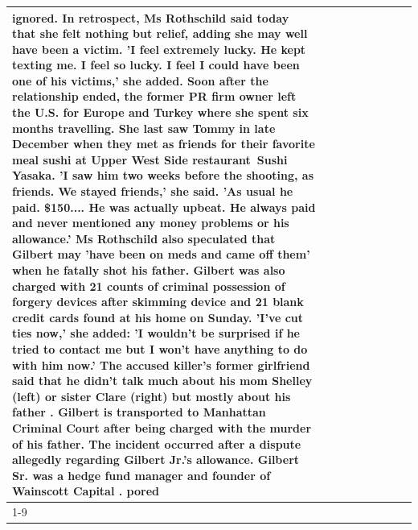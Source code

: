 \begin{table}[H]
\begin{tabular}{lllrlllll}
ignored. In retrospect, Ms Rothschild said today that she felt nothing but relief, adding she may well have been a victim. 'I feel extremely lucky. He kept texting me. I feel so lucky. I feel I could have been one of his victims,' she added. Soon after the relationship ended, the former PR firm owner left the U.S. for Europe and Turkey where she spent six months  travelling. She last saw Tommy in late December when they met as friends for their favorite meal sushi at Upper West Side restaurant Sushi Yasaka. 'I saw him two weeks before the shooting, as friends. We stayed friends,' she said. 'As usual he paid. \$150.... He was actually upbeat. He always paid and never mentioned any money problems or his allowance.' Ms Rothschild also speculated that Gilbert may 'have been on meds and came off them' when he fatally shot his father. Gilbert was also charged with 21 counts of criminal possession of forgery devices after skimming device and 21 blank credit cards found at his home on Sunday. 'I've cut ties now,' she added: 'I wouldn’t be surprised if he tried to contact me but I won’t have anything to do with him now.' The accused killer's former girlfriend said that he didn't talk much about his mom Shelley (left) or sister Clare (right) but mostly about his father . Gilbert is transported to Manhattan Criminal Court  after being charged with the murder of his father. The incident occurred after a dispute allegedly regarding Gilbert Jr.'s allowance. Gilbert Sr. was a hedge fund manager and founder of Wainscott Capital . pored \\
\cline{1-9}

\end{tabular}
\end{table}
